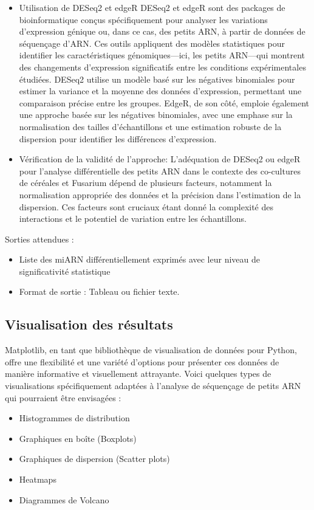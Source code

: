 \documentclass{report}
\begin{document}
\begin{itemize}
    \item Utilisation de DESeq2 et edgeR
    DESeq2 et edgeR sont des packages de bioinformatique conçus spécifiquement pour analyser les variations d'expression génique ou, dans ce cas, des petits ARN, à partir de données de séquençage d'ARN. Ces outils appliquent des modèles statistiques pour identifier les caractéristiques génomiques—ici, les petits ARN—qui montrent des changements d'expression significatifs entre les conditions expérimentales étudiées. DESeq2 utilise un modèle basé sur les négatives binomiales pour estimer la variance et la moyenne des données d'expression, permettant une comparaison précise entre les groupes. EdgeR, de son côté, emploie également une approche basée sur les négatives binomiales, avec une emphase sur la normalisation des tailles d'échantillons et une estimation robuste de la dispersion pour identifier les différences d'expression.
    \item Vérification de la validité de l'approche:
    L'adéquation de DESeq2 ou edgeR pour l'analyse différentielle des petits ARN dans le contexte des co-cultures de céréales et Fusarium dépend de plusieurs facteurs, notamment la normalisation appropriée des données et la précision dans l'estimation de la dispersion. Ces facteurs sont cruciaux étant donné la complexité des interactions et le potentiel de variation entre les échantillons.
\end{itemize} \vspace{.5cm}

\noindent Sorties attendues :
\begin{itemize}
    \item Liste des miARN différentiellement exprimés avec leur niveau de significativité statistique
    \item Format de sortie : Tableau ou fichier texte.
\end{itemize}

\subsection{Visualisation des résultats}
Matplotlib, en tant que bibliothèque de visualisation de données pour Python, offre une flexibilité et une variété d'options pour présenter ces données de manière informative et visuellement attrayante. Voici quelques types de visualisations spécifiquement adaptées à l'analyse de séquençage de petits ARN qui pourraient être envisagées :
\begin{itemize}
    \item Histogrammes de distribution
    \item Graphiques en boîte (Boxplots)
    \item Graphiques de dispersion (Scatter plots)
    \item Heatmaps
    \item Diagrammes de Volcano
\end{itemize} \vspace{.5cm}
\end{document}
